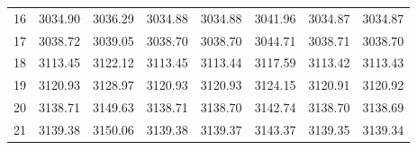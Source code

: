 \documentclass[10pt,oneside]{article}
\begin{document}
\begin{table}[h!]
\begin{tabular}{cccccccc}
16 &   3034.90 & 3036.29 & 3034.88 & 3034.88 &      3041.96 & 3034.87 & 3034.87 \\
17 &   3038.72 & 3039.05 & 3038.70 & 3038.70 &      3044.71 & 3038.71 & 3038.70 \\
18 &   3113.45 & 3122.12 & 3113.45 & 3113.44 &      3117.59 & 3113.42 & 3113.43 \\
19 &   3120.93 & 3128.97 & 3120.93 & 3120.93 &      3124.15 & 3120.91 & 3120.92 \\
20 &   3138.71 & 3149.63 & 3138.71 & 3138.70 &      3142.74 & 3138.70 & 3138.69 \\
21 &   3139.38 & 3150.06 & 3139.38 & 3139.37 &      3143.37 & 3139.35 & 3139.34 \\
\bottomrule
\end{tabular}
\end{table}

\clearpage
\end{document}
